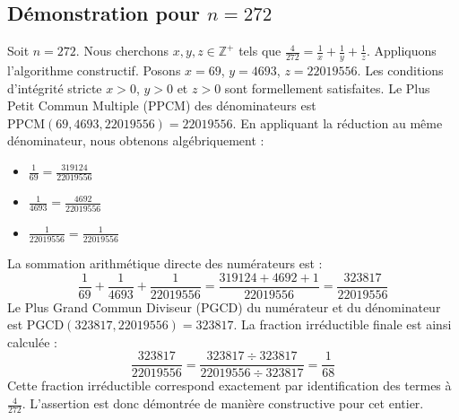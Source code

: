 \documentclass[11pt,a4paper]{article}
\begin{document}
\subsection{Démonstration pour $n = 272$}
Soit $n = 272$. Nous cherchons $x, y, z \in \mathbb{Z}^{+}$ tels que $\frac{4}{272} = \frac{1}{x} + \frac{1}{y} + \frac{1}{z}$.
Appliquons l'algorithme constructif. Posons $x = 69$, $y = 4693$, $z = 22019556$.
Les conditions d'intégrité stricte $x > 0$, $y > 0$ et $z > 0$ sont formellement satisfaites.
Le Plus Petit Commun Multiple (PPCM) des dénominateurs est $\text{PPCM}(69, 4693, 22019556) = 22019556$.
En appliquant la réduction au même dénominateur, nous obtenons algébriquement :
\begin{itemize}
    \item $\frac{1}{69} = \frac{319124}{22019556}$
    \item $\frac{1}{4693} = \frac{4692}{22019556}$
    \item $\frac{1}{22019556} = \frac{1}{22019556}$
\end{itemize}
La sommation arithmétique directe des numérateurs est :
$$ \frac{1}{69} + \frac{1}{4693} + \frac{1}{22019556} = \frac{319124 + 4692 + 1}{22019556} = \frac{323817}{22019556} $$
Le Plus Grand Commun Diviseur (PGCD) du numérateur et du dénominateur est $\text{PGCD}(323817, 22019556) = 323817$.
La fraction irréductible finale est ainsi calculée :
$$ \frac{323817}{22019556} = \frac{323817 \div 323817}{22019556 \div 323817} = \frac{1}{68} $$
Cette fraction irréductible correspond exactement par identification des termes à $\frac{4}{272}$. L'assertion est donc démontrée de manière constructive pour cet entier.
\end{document}
